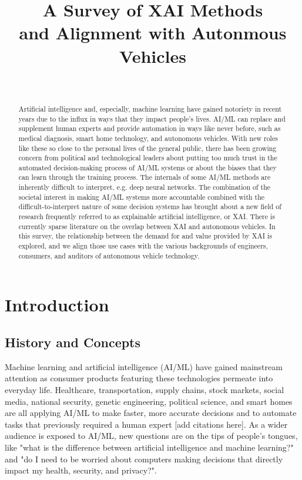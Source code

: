 \documentclass{IEEEtran}
\begin{document}
\title{A Survey of XAI Methods\\and Alignment with Autonmous Vehicles}
\author{
    \\
}
\maketitle

\begin{abstract}
Artificial intelligence and, especially, machine learning have gained notoriety in recent years due to the influx in ways that they impact people's lives.  AI/ML can replace and supplement human experts and provide automation in ways like never before, such as medical diagnosis, smart home technology, and autonomous vehicles.  With new roles like these so close to the personal lives of the general public, there has been growing concern from political and technological leaders about putting too much trust in the automated decision-making process of AI/ML systems or about the biases that they can learn through the training process.  The internals of some AI/ML methods are inherently difficult to interpret, e.g. deep neural networks.  The combination of the societal interest in making AI/ML systems more accountable combined with the difficult-to-interpret nature of some decision systems has brought about a new field of research frequently referred to as explainable artificial intelligence, or XAI.  There is currently sparse literature on the overlap between XAI and autonomous vehicles.  In this survey, the relationship between the demand for and value provided by XAI is explored, and we align those use cases with the various backgrounds of engineers, consumers, and auditors of autonomous vehicle technology.
\end{abstract}

\section{Introduction}

\subsection{History and Concepts}

Machine learning and artificial intelligence (AI/ML) have gained mainstream attention as consumer products featuring these technologies permeate into everyday life.  Healthcare, transportation, supply chains, stock markets, social media, national security, genetic engineering, political science, and smart homes are all applying AI/ML to make faster, more accurate decisions and to automate tasks that previously required a human expert [add citations here].  As a wider audience is exposed to AI/ML, new questions are on the tips of people's tongues, like "what is the difference between artificial intelligence and machine learning?" and "do I need to be worried about computers making decisions that directly impact my health, security, and privacy?".
\end{document}
